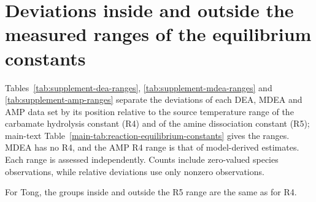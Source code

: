 \documentclass[a4paper,11pt]{article}
\begin{document}
\section{Deviations inside and outside the measured ranges of the equilibrium constants}\label{sec:s-ranges}
Tables~\ref{tab:supplement-dea-ranges}, \ref{tab:supplement-mdea-ranges} and \ref{tab:supplement-amp-ranges} separate the deviations of each DEA, MDEA and AMP data set by its position relative to the source temperature range of the carbamate hydrolysis constant (R4) and of the amine dissociation constant (R5); main-text Table~\ref{main-tab:reaction-equilibrium-constants} gives the ranges.
MDEA has no R4, and the AMP R4 range is that of model-derived estimates.
Each range is assessed independently.
Counts include zero-valued species observations, while relative deviations use only nonzero observations.





For Tong, the groups inside and outside the R5 range are the same as for R4.
\end{document}
